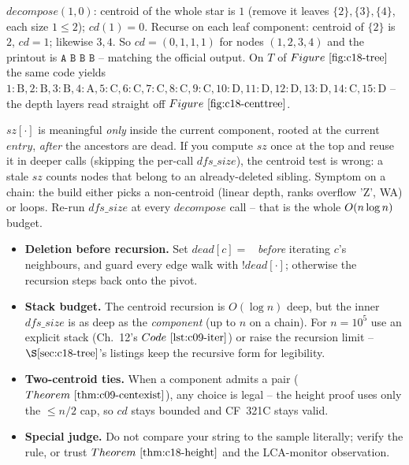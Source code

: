 \begin{tracebox}[Sample 1: the star \(n=4\), edges \(1\!-\!2,1\!-\!3,1\!-\!4\)]
\(\mathit{decompose}(1,0)\): centroid of the whole star is \(1\) (remove it leaves
\(\{2\},\{3\},\{4\}\), each size \(1\le 2\)); \(\mathit{cd}(1)=0\). Recurse on each
leaf component: centroid of \(\{2\}\) is \(2\), \(\mathit{cd}=1\); likewise \(3,4\).
So \(\mathit{cd}=(0,1,1,1)\) for nodes \((1,2,3,4)\) and the printout is
\(\boxed{\texttt{A B B B}}\) -- matching the official output. On \(T\) of
\(\figref{c18-tree}\) the same code yields
\(1\!:\!\text{B},2\!:\!\text{B},3\!:\!\text{B},4\!:\!\text{A},5\!:\!\text{C},6\!:\!\text{C},
7\!:\!\text{C},8\!:\!\text{C},9\!:\!\text{C},10\!:\!\text{D},11\!:\!\text{D},12\!:\!\text{D},
13\!:\!\text{D},14\!:\!\text{C},15\!:\!\text{D}\) -- the depth layers read straight
off \(\figref{c18-centtree}\).
\end{tracebox}

\begin{warningbox}
\(\mathit{sz}[\cdot]\) is meaningful \emph{only} inside the current component,
rooted at the current \(\mathit{entry}\), \emph{after} the ancestors are dead. If you
compute \(\mathit{sz}\) once at the top and reuse it in deeper calls (skipping the
per-call \(\mathit{dfs\_size}\)), the centroid test is wrong: a stale \(\mathit{sz}\)
counts nodes that belong to an already-deleted sibling. Symptom on a chain: the build
either picks a non-centroid (linear depth, ranks overflow 'Z', WA) or loops. Re-run
\(\mathit{dfs\_size}\) at every \(\mathit{decompose}\) call -- that is the whole
\(O(n\log n)\) budget.
\end{warningbox}

\begin{hardeningbox}
\begin{itemize}[nosep,leftmargin=1.4em]
  \item \textbf{Deletion before recursion.} Set \(\mathit{dead}[c]=\)~
        \emph{before} iterating \(c\)'s neighbours, and guard every edge walk with
        \(\mathit{!dead}[\cdot]\); otherwise the recursion steps back onto the pivot.
  \item \textbf{Stack budget.} The centroid recursion is \(O(\log n)\) deep, but the
        inner \(\mathit{dfs\_size}\) is as deep as the \emph{component} (up to \(n\) on
        a chain). For \(n=10^5\) use an explicit stack (Ch.~12's \(\coderef{c09-iter}\))
        or raise the recursion limit -- \(\secref{c18-tree}\)'s listings keep the
        recursive form for legibility.
  \item \textbf{Two-centroid ties.} When a component admits a pair
        (\(\thmref{c09-centexist}\)), any choice is legal -- the height proof uses only
        the \(\le n/2\) cap, so \(\mathit{cd}\) stays bounded and CF~321C stays valid.
  \item \textbf{Special judge.} Do not compare your string to the sample literally;
        verify the rule, or trust \(\thmref{c18-height}\) and the LCA-monitor
        observation.
\end{itemize}
\end{hardeningbox}

